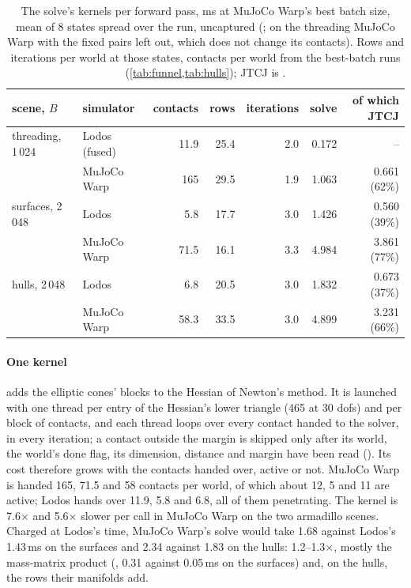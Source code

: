 \begin{table}[t]
\centering
\caption{The solve's kernels per forward pass, ms at MuJoCo Warp's best batch size, mean of 8 states spread over the run, uncaptured (; on the threading MuJoCo Warp with the fixed pairs left out, which does not change its contacts). Rows and iterations per world at those states, contacts per world from the best-batch runs (\cref{tab:funnel,tab:hulls}); JTCJ is .}
\label{tab:solve}
\small
\begin{tabularx}{\linewidth}{@{}L{27mm}Yrrrrr@{}}
\toprule
scene, $B$ & simulator & contacts & rows & iterations & solve & of which JTCJ \\
\midrule
threading, 1\,024 & Lodos (fused) & 11.9 & 25.4 & 2.0 & 0.172 & -- \\
& MuJoCo Warp & 165 & 29.5 & 1.9 & 1.063 & 0.661 (62\%) \\
surfaces, 2\,048 & Lodos & 5.8 & 17.7 & 3.0 & 1.426 & 0.560 (39\%) \\
& MuJoCo Warp & 71.5 & 16.1 & 3.3 & 4.984 & 3.861 (77\%) \\
hulls, 2\,048 & Lodos & 6.8 & 20.5 & 3.0 & 1.832 & 0.673 (37\%) \\
& MuJoCo Warp & 58.3 & 33.5 & 3.0 & 4.899 & 3.231 (66\%) \\
\bottomrule
\end{tabularx}
\end{table}

\paragraph{One kernel}  adds the elliptic cones' blocks to the Hessian of Newton's method. It is launched with one thread per entry of the Hessian's lower triangle (465 at 30 dofs) and per block of contacts, and each thread loops over every contact handed to the solver, in every iteration; a contact outside the margin is skipped only after its world, the world's done flag, its dimension, distance and margin have been read (). Its cost therefore grows with the contacts handed over, active or not. MuJoCo Warp is handed 165, 71.5 and 58 contacts per world, of which about 12, 5 and 11 are active; Lodos hands over 11.9, 5.8 and 6.8, all of them penetrating. The kernel is 7.6$\times$ and 5.6$\times$ slower per call in MuJoCo Warp on the two armadillo scenes. Charged at Lodos's time, MuJoCo Warp's solve would take 1.68 against Lodos's 1.43\,ms on the surfaces and 2.34 against 1.83 on the hulls: 1.2--1.3$\times$, mostly the mass-matrix product (, 0.31 against 0.05\,ms on the surfaces) and, on the hulls, the rows their manifolds add.

